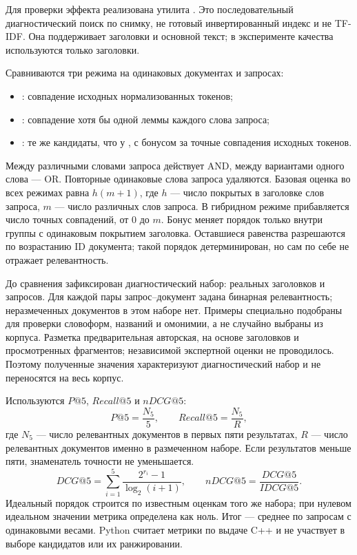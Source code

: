 \documentclass[12pt,a4paper]{article}
\newcommand{\code}[1]{\texttt{\detokenize{#1}}}
\begin{document}
Для проверки эффекта реализована утилита \code{lemma_search}. Это
последовательный диагностический поиск по снимку, не готовый инвертированный
индекс и не TF-IDF. Она поддерживает заголовки и основной текст;
в эксперименте качества используются только заголовки.

Сравниваются три режима на одинаковых документах и запросах:
\begin{itemize}
\item \code{exact}: совпадение исходных нормализованных токенов;
\item \code{lemma}: совпадение хотя бы одной леммы каждого слова запроса;
\item \code{hybrid}: те же кандидаты, что у \code{lemma}, с бонусом за
точные совпадения исходных токенов.
\end{itemize}
Между различными словами запроса действует AND, между вариантами одного
слова --- OR. Повторные одинаковые слова запроса удаляются.
Базовая оценка во всех режимах равна $h(m+1)$, где $h$ --- число покрытых
в заголовке слов запроса, $m$ --- число различных слов запроса.
В гибридном режиме прибавляется число точных совпадений, от 0 до $m$.
Бонус меняет порядок только внутри группы с одинаковым покрытием заголовка.
Оставшиеся равенства разрешаются по возрастанию ID документа;
такой порядок детерминирован, но сам по себе не отражает релевантность.

До сравнения зафиксирован диагностический набор: \PoolDocuments{} реальных
заголовков и \QueryCount{} запросов. Для каждой пары запрос--документ задана
бинарная релевантность; неразмеченных документов в этом наборе нет.
Примеры специально подобраны для проверки словоформ, названий и омонимии,
а не случайно выбраны из корпуса. Разметка предварительная авторская,
на основе заголовков и просмотренных фрагментов; независимой экспертной
оценки не проводилось. Поэтому полученные значения характеризуют
диагностический набор и не переносятся на весь корпус.

Используются $P@5$, $Recall@5$ и $nDCG@5$:
\[
P@5=\frac{N_5}{5},\qquad Recall@5=\frac{N_5}{R},
\]
где $N_5$ --- число релевантных документов в первых пяти результатах,
$R$ --- число релевантных документов именно в размеченном наборе.
Если результатов меньше пяти, знаменатель точности не уменьшается.
\[
DCG@5=\sum_{i=1}^{5}\frac{2^{r_i}-1}{\log_2(i+1)},\qquad
nDCG@5=\frac{DCG@5}{IDCG@5}.
\]
Идеальный порядок строится по известным оценкам того же набора; при нулевом
идеальном значении метрика определена как ноль. Итог --- среднее по запросам
с одинаковыми весами. Python считает метрики по выдаче C++ и не участвует
в выборе кандидатов или их ранжировании.
\end{document}
